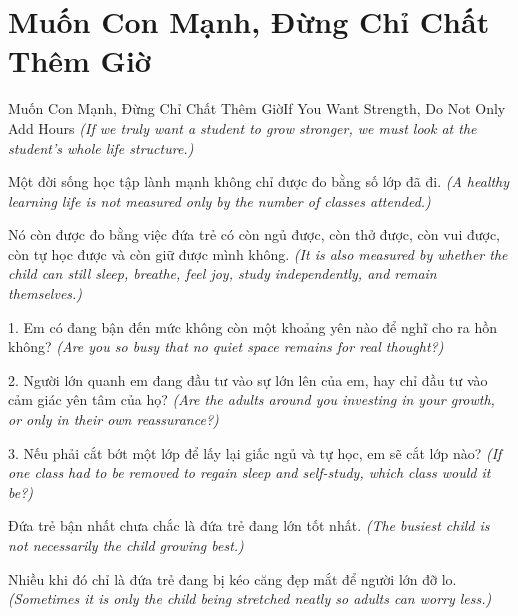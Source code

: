 \section{Muốn Con Mạnh, Đừng Chỉ Chất Thêm Giờ}
\begin{truyen}{Muốn Con Mạnh, Đừng Chỉ Chất Thêm Giờ}{If You Want Strength, Do Not Only Add Hours}
\textit{(If we truly want a student to grow stronger, we must look at the student's whole life structure.)}

\end{truyen}

\begin{baihoc}
Một đời sống học tập lành mạnh không chỉ được đo bằng số lớp đã đi.
\textit{(A healthy learning life is not measured only by the number of classes attended.)}

Nó còn được đo bằng việc đứa trẻ có còn ngủ được, còn thở được, còn vui được, còn tự học được và còn giữ được mình không.
\textit{(It is also measured by whether the child can still sleep, breathe, feel joy, study independently, and remain themselves.)}
\end{baihoc}

\begin{tuhocnhanh}
1. Em có đang bận đến mức không còn một khoảng yên nào để nghĩ cho ra hồn không? \textit{(Are you so busy that no quiet space remains for real thought?)}

2. Người lớn quanh em đang đầu tư vào sự lớn lên của em, hay chỉ đầu tư vào cảm giác yên tâm của họ? \textit{(Are the adults around you investing in your growth, or only in their own reassurance?)}

3. Nếu phải cắt bớt một lớp để lấy lại giấc ngủ và tự học, em sẽ cắt lớp nào? \textit{(If one class had to be removed to regain sleep and self-study, which class would it be?)}
\end{tuhocnhanh}

\begin{tongketchuong}
Đứa trẻ bận nhất chưa chắc là đứa trẻ đang lớn tốt nhất.
\textit{(The busiest child is not necessarily the child growing best.)}

Nhiều khi đó chỉ là đứa trẻ đang bị kéo căng đẹp mắt để người lớn đỡ lo.
\textit{(Sometimes it is only the child being stretched neatly so adults can worry less.)}
\end{tongketchuong}

\ngancach